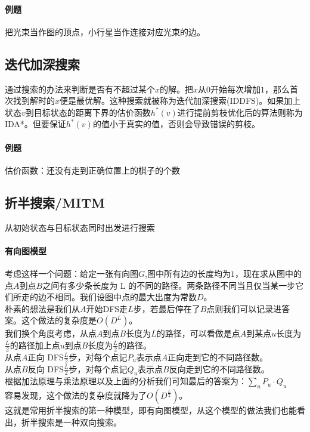\documentclass[]{cpp}
\begin{document}
\paragraph{例题} 把光束当作图的顶点，小行星当作连接对应光束的边。
\subsection{迭代加深搜索} 通过搜索的办法来判断是否有不超过某个$x$的解。把$x$从$0$开始每次增加$1$，那么首次找到解时的$x$便是最优解。这种搜索就被称为迭代加深搜索(IDDFS)。如果加上状态$v$到目标状态的距离下界的估价函数$h^*(v)$进行提前剪枝优化后的算法则称为IDA*。但要保证$h^*(v)$的值小于真实的值，否则会导致错误的剪枝。
\paragraph{例题} 估价函数：还没有走到正确位置上的棋子的个数
\subsection{折半搜索/MITM} 从初始状态与目标状态同时出发进行搜索
\paragraph{有向图模型}
	考虑这样一个问题：给定一张有向图$G$,图中所有边的长度均为$1$，现在求从图中的点$A$到点$B$之间有多少条长度为 L 的不同的路径。两条路径不同当且仅当某一步它们所走的边不相同。我们设图中点的最大出度为常数$D$。\\
	朴素的想法是我们从$A$开始DFS走$L$步，若最后停在了$B$点则我们可以记录进答案。这个做法的复杂度是$O(D^L)$。\\
	我们换个角度考虑，从点$A$到点$B$长度为$L$的路径，可以看做是点$A$到某点$u$长度为$\frac{L}{2}$的路径加上点$u$到点$B$长度为$\frac{L}{2}$的路径。\\
	从点$A$正向 DFS$\frac{L}{2}$步，对每个点记$P_u$表示点$A$正向走到它的不同路径数。\\
	从点$B$反向 DFS$\frac{L}{2}$步，对每个点记$Q_u$表示点$B$反向走到它的不同路径数。\\
	根据加法原理与乘法原理以及上面的分析我们可知最后的答案为：$\sum\limits_u P_u \cdot Q_u$\\
	容易发现，这个做法的复杂度就降为了$O(D^\frac{L}{2})$。\\
	这就是常用折半搜索的第一种模型，即有向图模型，从这个模型的做法我们也能看出，折半搜索是一种双向搜索。
\end{document}
